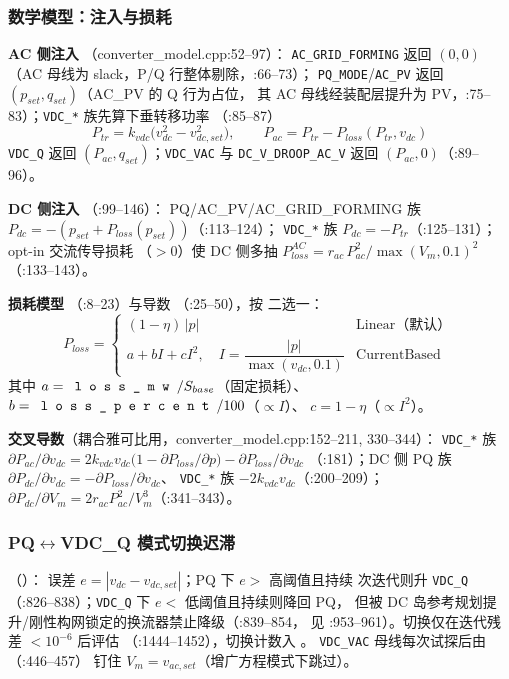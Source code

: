 \subsubsection*{数学模型：注入与损耗}
\textbf{AC 侧注入} （converter\_model.cpp:52--97）：
\texttt{AC\_GRID\_FORMING} 返回 $(0,0)$（AC 母线为 slack，P/Q 行整体剔除，:66--73）；
\texttt{PQ\_MODE}/\texttt{AC\_PV} 返回 $(p_{set},q_{set})$（AC\_PV 的 Q 行为占位，
其 AC 母线经装配层提升为 PV，:75--83）；\texttt{VDC\_*} 族先算下垂转移功率
（:85--87）
\[
P_{tr}=k_{vdc}\big(v_{dc}^{2}-v_{dc,set}^{2}\big),\qquad P_{ac}=P_{tr}-P_{loss}(P_{tr},v_{dc})
\]
\texttt{VDC\_Q} 返回 $(P_{ac},q_{set})$；\texttt{VDC\_VAC} 与
\texttt{DC\_V\_DROOP\_AC\_V} 返回 $(P_{ac},0)$（:89--96）。

\textbf{DC 侧注入} （:99--146）：
PQ/AC\_PV/AC\_GRID\_FORMING 族 $P_{dc}=-(p_{set}+P_{loss}(p_{set}))$（:113--124）；
\texttt{VDC\_*} 族 $P_{dc}=-P_{tr}$（:125--131）；opt-in 交流传导损耗
（$>0$）使 DC 侧多抽
$P_{loss}^{AC}=r_{ac}\,P_{ac}^{2}/\max(V_m,0.1)^{2}$（:133--143）。

\textbf{损耗模型} （:8--23）与导数
（:25--50），按  二选一：
\[
P_{loss}=\begin{cases}
(1-\eta)\,|p| & \text{Linear（默认）}\\[2pt]
a+bI+cI^{2},\quad I=\dfrac{|p|}{\max(v_{dc},0.1)} & \text{CurrentBased}
\end{cases}
\]
其中 $a=\fld{loss\_mw}/S_{base}$（固定损耗）、$b=\fld{loss\_percent}/100$（$\propto I$）、
$c=1-\eta$（$\propto I^2$）。

\textbf{交叉导数}（耦合雅可比用，converter\_model.cpp:152--211, 330--344）：
\texttt{VDC\_*} 族
$\partial P_{ac}/\partial v_{dc}=2k_{vdc}v_{dc}\big(1-\partial P_{loss}/\partial p\big)-\partial P_{loss}/\partial v_{dc}$
（:181）；DC 侧 PQ 族 $\partial P_{dc}/\partial v_{dc}=-\partial P_{loss}/\partial v_{dc}$、
\texttt{VDC\_*} 族 $-2k_{vdc}v_{dc}$（:200--209）；
$\partial P_{dc}/\partial V_m=2r_{ac}P_{ac}^{2}/V_m^{3}$（:341--343）。

\subsubsection*{PQ$\leftrightarrow$VDC\_Q 模式切换迟滞}
（）：
误差 $e=|v_{dc}-v_{dc,set}|$；PQ 下 $e>$ 高阈值且持续 
次迭代则升 \texttt{VDC\_Q}（:826--838）；\texttt{VDC\_Q} 下 $e<$ 低阈值且持续则降回 PQ，
但被 DC 岛参考规划提升/刚性构网锁定的换流器禁止降级（:839--854，
 见 :953--961）。切换仅在迭代残差 $<10^{-6}$ 后评估
（:1444--1452），切换计数入 。
\texttt{VDC\_VAC} 母线每次试探后由 （:446--457）
钉住 $V_m=v_{ac,set}$（增广方程模式下跳过）。

